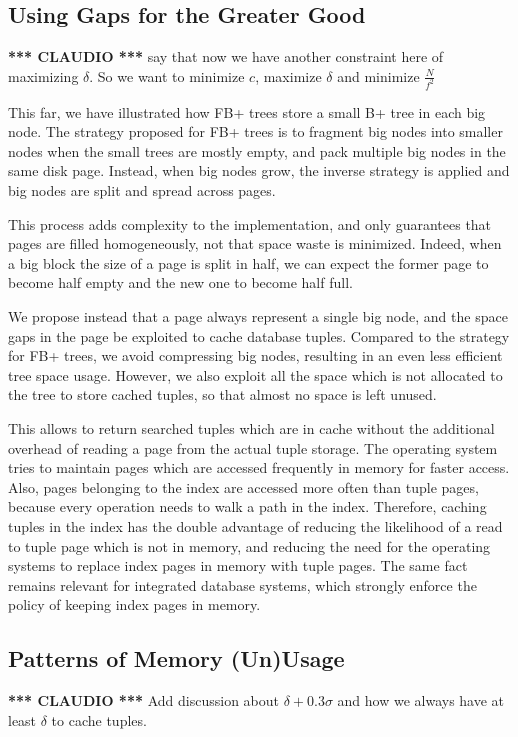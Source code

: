 \documentclass{article}
\newcommand{\claudio}{\textcolor{Cerulean}{\textbf{*** CLAUDIO ***} }}
\begin{document}
\subsection{Using Gaps for the Greater Good}
\claudio say that now we have another constraint here of maximizing $\delta$. So we want to minimize $c$, maximize $\delta$ and minimize $\frac{N}{f^2}$

This far, we have illustrated how FB+ trees store a small B+ tree in each big node.
The strategy proposed for FB+ trees is to fragment big nodes into smaller nodes when the small trees
are mostly empty, and pack multiple big nodes in the same disk page.
Instead, when big nodes grow, the inverse strategy is applied and big nodes are split and spread
across pages.

This process adds complexity to the implementation, and only guarantees that pages are filled
homogeneously, not that space waste is minimized.
Indeed, when a big block the size of a page is split in half,
we can expect the former page to become half empty and the new one to become half full.

We propose instead that a page always represent a single big node, and the space gaps in the page
be exploited to cache database tuples.
Compared to the strategy for FB+ trees, we avoid compressing big nodes, resulting in an
even less efficient tree space usage.
However, we also exploit all the space which is not allocated to the tree to store cached tuples,
so that almost no space is left unused.

This allows to return searched tuples which are in cache without the additional overhead of reading a page from
the actual tuple storage.
The operating system tries to maintain pages which are accessed frequently in memory for faster
access.
Also, pages belonging to the index are accessed more often than tuple pages, because every operation
needs to walk a path in the index.
Therefore, caching tuples in the index has the double advantage of reducing the likelihood
of a read to tuple page which is not in memory, and reducing the need for the operating systems
to replace index pages in memory with tuple pages.
The same fact remains relevant for integrated database systems, which strongly enforce the policy of keeping
index pages in memory.


\subsection{Patterns of Memory (Un)Usage}
\claudio
Add discussion about $\delta + 0.3 \sigma$ and how we always have at least $\delta$ to cache tuples. 
\end{document}

